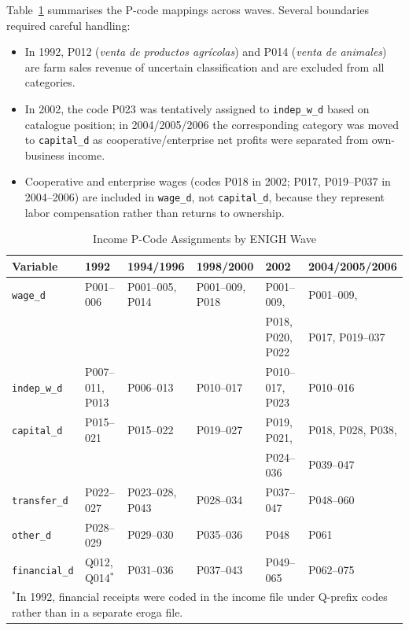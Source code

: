 Table~\ref{tab:income_pcodes} summarises the P-code mappings across waves.
Several boundaries required careful handling:

\begin{itemize}
  \item In 1992, P012 (\textit{venta de productos agr\'icolas}) and P014
    (\textit{venta de animales}) are farm sales revenue of uncertain
    classification and are excluded from all categories.
  \item In 2002, the code P023 was tentatively assigned to \texttt{indep\_w\_d}
    based on catalogue position; in 2004/2005/2006 the corresponding category
    was moved to \texttt{capital\_d} as cooperative/enterprise net profits were
    separated from own-business income.
  \item Cooperative and enterprise wages (codes P018 in 2002; P017, P019--P037
    in 2004--2006) are included in \texttt{wage\_d}, not \texttt{capital\_d},
    because they represent labor compensation rather than returns to ownership.
\end{itemize}

\begin{table}[h!]
\centering
\caption{Income P-Code Assignments by ENIGH Wave}
\label{tab:income_pcodes}
\small
\begin{tabular}{llllll}
\hline\hline
Variable & 1992 & 1994/1996 & 1998/2000 & 2002 & 2004/2005/2006 \\
\hline
\texttt{wage\_d}     & P001--006 & P001--005, P014 & P001--009, P018 & P001--009, & P001--009, \\
                     &           &                 &                 & P018, P020, P022 & P017, P019--037 \\
\texttt{indep\_w\_d} & P007--011, P013 & P006--013 & P010--017 & P010--017, P023 & P010--016 \\
\texttt{capital\_d}  & P015--021 & P015--022 & P019--027 & P019, P021, & P018, P028, P038, \\
                     &           &           &           & P024--036   & P039--047 \\
\texttt{transfer\_d} & P022--027 & P023--028, P043 & P028--034 & P037--047 & P048--060 \\
\texttt{other\_d}    & P028--029 & P029--030 & P035--036 & P048 & P061 \\
\texttt{financial\_d}& Q012, Q014$^*$ & P031--036 & P037--043 & P049--065 & P062--075 \\
\hline\hline
\multicolumn{6}{l}{\footnotesize $^*$In 1992, financial receipts were coded in the income file under Q-prefix codes rather than in a separate eroga file.}
\end{tabular}
\end{table}

